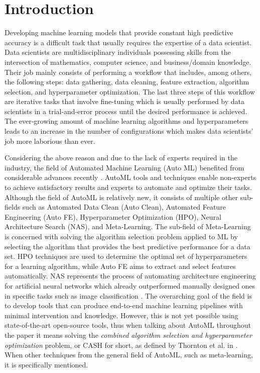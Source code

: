 \documentclass{sig-alternate-br}
\begin{document}
\section{Introduction}
Developing machine learning models that provide constant high predictive accuracy is a difficult task that usually requires the expertise of a data scientist. Data scientists are multidisciplinary individuals possessing skills from the intersection of mathematics, computer science, and business/domain knowledge. Their job mainly consists of performing a workflow that includes, among others, the following steps: data gathering, data cleaning, feature extraction, algorithm selection, and hyperparameter optimization. The last three steps of this workflow are iterative tasks that involve fine-tuning which is usually performed by data scientists in a trial-and-error process until the desired performance is achieved. The ever-growing amount of machine learning algorithms and hyperparameters leads to an increase in the number of configurations which makes data scientists' job more laborious than ever. 

Considering the above reason and due to the lack of experts required in the industry, the field of Automated Machine Learning (Auto ML) benefited from considerable advances recently \cite{elshawi2019automated}. AutoML tools and techniques enable non-experts to achieve satisfactory results and experts to automate and optimize their tasks. Although the field of AutoML is relatively new, it consists of multiple other sub-fields such as Automated Data Clean (Auto Clean), Automated Feature Engineering (Auto FE), Hyperparameter Optimization (HPO), Neural Architecture Search (NAS), and Meta-Learning. The sub-field of Meta-Learning is concerned with solving the algorithm selection problem \cite{rice1976algorithm} applied to ML by selecting the algorithm that provides the best predictive performance for a data set. HPO techniques are used to determine the optimal set of hyperparameters for a learning algorithm, while Auto FE aims to extract and select features automatically. NAS represents the process of automating architecture engineering for artificial neural networks which already outperformed manually designed ones in specific tasks such as image classification \cite{elsken2018neural}. The overarching goal of the field is to develop tools that can produce end-to-end machine learning pipelines with minimal intervention and knowledge. However, this is not yet possible using state-of-the-art open-source tools, thus when talking about AutoML throughout the paper it means solving the \textit{combined algorithm selection and hyperparameter optimization} problem, or CASH for short, as defined by Thornton et al. in \cite{thornton2013autoweka}. When other techniques from the general field of AutoML, such as meta-learning, it is specifically mentioned.
\end{document}
